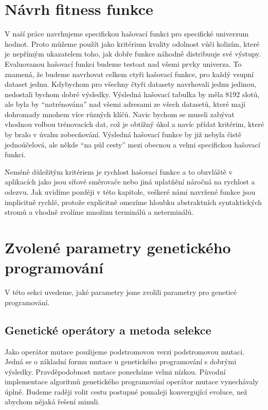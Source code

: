 \section{Návrh fitness funkce}

V naší práce navrhujeme specifickou
hašovací funkci pro specifické univerzum hodnot. Proto můžeme použít jako kritérium
kvality odolnost vůči kolizím, které je nepřímým ukazatelem toho, jak dobře funkce
náhodně distribuuje své výstupy. Evaluovanou hašovací
funkci budeme testoat nad všemi prvky univerza. To znamená, že budeme navrhovat
celkem ctyři hašovací funkce, pro každý vsupní dataset jednu. Kdybychom pro všechny čtyři
datasety navrhovali jednu jedinou, nedostali bychom dobré výsledky. Výsledná hašovací tabulka
by měla 8192 slotů, ale byla by ``natrénována'' nad všemi adresami ze všech datasetů, které mají dohromady mnohem více 
různých klíčů. Navic 
bychom se museli zabývat vhodnou volbou trénovacích dat, což je obtížný úkol a navíc přídat
kritérim, které by bralo v úvahu zobecňování. Výsledná hašovací funkce by již nebyla čistě jednoúčelová, ale
někde ``na půl cesty'' mezi obecnou a velmi specifickou hašovací funkci.

Neméně důležitým kritériem je rychlost hašovací funkce a to obzvláště v aplikacích jako jsou
síťové směrovače nebo jiná uplatňění náročná na rychlost a odezvu. Jak uvidíme později v této
kapitole, veškeré námi navržené funkce jsou implicitně rychlé, protože explicitně omezíme hloubku
abstraktních syntaktických stromů a vhodně zvolíme množinu terminálů a neterminálů. 

\section{Zvolené parametry genetického programování}

V této sekci uvedeme, jaké parametry jsme zvolili parametry pro geneticé programování.

\subsection{Genetické operátory a metoda selekce}

Jako operátor mutace použijeme podstromovou verzi podstromovou mutaci. Jedná se o základní formu mutace
u genetického programování s dobrými výsledky.
Pravděpodobnost mutace ponecháme velmi nízkou. Původní implementace algoritmů
genetického programování \cite{GPTutorial} operátor mutace vynechávaly úplně. 
Budeme raději volit cestu postupné pomaleji konvergující evoluce, než abychom 
nějaká řešení minuli. 

